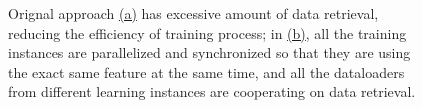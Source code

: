 \documentclass[conference]{IEEEtran}
\begin{document}
\begin{figure}[!htb] 
	
	
	\caption{\small 
		Orignal approach \hyperref[dl_a]{(a)} has excessive amount of data retrieval, reducing the efficiency of training process; 
		in \hyperref[dl_b]{(b)}, all the training instances are parallelized and synchronized so that they are using the exact same feature at the same time, and all the dataloaders from different learning instances are cooperating on data retrieval. }
	\label{fig:dl}
\end{figure}
\end{document}
